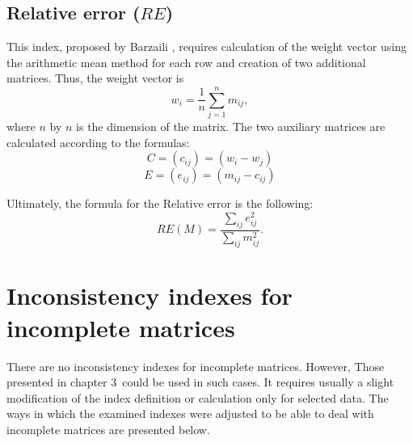 \subsection{Relative error ($\textit{RE}$)}

This index, proposed by Barzaili \cite{Jonathan1998}, requires calculation of the weight vector using the arithmetic mean method for each row and creation of two additional matrices. Thus, the weight vector is $$w_{i}=\frac{1}{n}\sum_{j=1}^{n}m_{ij},$$ where $n$  by $n$ is the dimension of the matrix. The two auxiliary matrices are calculated according to the formulas:
$$C=\left(c_{ij}\right)=\left(w_{i}-w_{j}\right)$$
$$E=\left(e_{ij}\right)=\left(m_{ij}-c_{ij}\right)$$

Ultimately, the formula for the Relative error is the following:
	\begin{equation} 
		RE(M)=\frac{\sum_{ij}e_{ij}^{2}}{\sum_{ij}m_{ij}^{2}}.
	 \end{equation}


\section{Inconsistency indexes for incomplete matrices}
\label{sec:inconsistencyIndexesForIncompleteMatrices}

There are no inconsistency indexes for incomplete matrices. However, Those presented in chapter 3~could be used in such cases. It requires usually a slight modification of the index definition or calculation only for selected data. The ways in which the examined indexes were adjusted to be able to deal with incomplete matrices are presented below.

